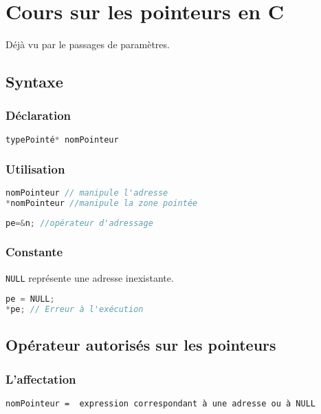 \chapter{Cours sur les pointeurs en C}\label{pointeurs}
Déjà vu par le passages de paramètres.
\section{Syntaxe}
	\subsection{Déclaration}
\begin{lstlisting}[language=C, numbers=none,frame=none]
typePointé* nomPointeur
\end{lstlisting}

	\subsection{Utilisation}
\begin{lstlisting}[language=C, numbers=none,frame=none]
nomPointeur // manipule l'adresse
*nomPointeur //manipule la zone pointée
\end{lstlisting}
\begin{lstlisting}[language=C, numbers=none,frame=none]
pe=&n; //opérateur d'adressage
\end{lstlisting}

\subsection{Constante}
	\texttt{NULL} représente une adresse inexistante.
	\begin{lstlisting}[language=C, numbers=none,frame=none]
pe = NULL;
*pe; // Erreur à l'exécution
	\end{lstlisting}

\section{Opérateur autorisés sur les pointeurs}
\subsection{L'affectation}
\begin{verbatim}
nomPointeur =  expression correspondant à une adresse ou à NULL
\end{verbatim}

